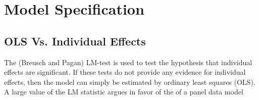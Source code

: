 \documentclass[landscape,letterpaper,9pt]{article}
\begin{document}
%
%

\newpage
\section{Model Specification}

\subsection{ OLS Vs. Individual Effects}
The (Breusch and Pagan) LM-test is used to test the hypothesis that individual effects are significant.
 If these tests do not provide any evidence for individual effects,
 then the model can simply be estimated by ordinary least squares (OLS).
A large value of the LM statistic argues in favor of the of a panel data model

\newpage
\end{document}
